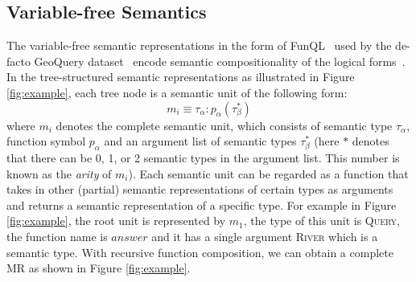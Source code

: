 

\subsection{Variable-free Semantics}
\label{sec:semantics}
The variable-free semantic representations in the form of FunQL~\cite{kate2005learning} used by the de-facto GeoQuery dataset~\cite{zelle1996learning} encode semantic compositionality of the logical forms~\cite{cheng2017learning}. 
In the tree-structured semantic representations as illustrated in Figure \ref{fig:example}, each tree node is a semantic unit of the following form:
\begin{equation*}
m_i \equiv \tau_\alpha : p_\alpha(\tau_\beta ^ *)
\end{equation*}
where $m_i$ denotes the complete semantic unit, which consists of semantic type $\tau_\alpha$, function symbol $p_\alpha$ and an argument list of semantic types $\tau_\beta^*$ (here $*$ denotes that there can be 0, 1, or 2 semantic types in the  argument list. This number is known as the {\em arity} of $m_i$). 
Each semantic unit can be regarded as a function that takes in other (partial) semantic representations of certain types as arguments and returns a semantic representation of a specific type.
For example in Figure \ref{fig:example}, the root unit is represented by $m_1$, the type of this unit is \textsc{Query}, the function name is $answer$ and it has a single argument  \textsc{River} which is a semantic type. 
With  recursive function composition, we can obtain a complete MR as shown in Figure \ref{fig:example}.

